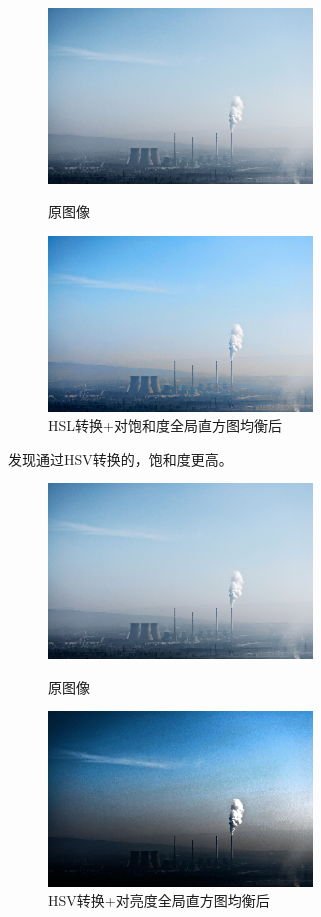 \documentclass[11pt, a4paper, UTF8]{ctexart}
\begin{document}
\begin{figure}[H]
  \centering
  \begin{minipage}[t]{0.48\textwidth}
  \centering
  \includegraphics[width=7cm]{color.jpg}
  \caption{原图像}
  \end{minipage}
  \begin{minipage}[t]{0.48\textwidth}
  \centering
  \includegraphics[width=7cm]{color_hsl_s_global_converted.jpg}
  \caption{HSL转换+对饱和度全局直方图均衡后}
  \end{minipage}
\end{figure}
  
发现通过HSV转换的，饱和度更高。



\begin{figure}[H]
  \centering
  \begin{minipage}[t]{0.48\textwidth}
  \centering
  \includegraphics[width=7cm]{color.jpg}
  \caption{原图像}
  \end{minipage}
  \begin{minipage}[t]{0.48\textwidth}
  \centering
  \includegraphics[width=7cm]{color_hsv_v_global_converted.jpg}
  \caption{HSV转换+对亮度全局直方图均衡后}
  \end{minipage}
\end{figure}
\end{document}
